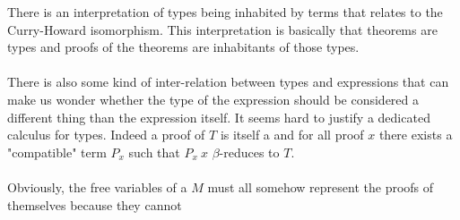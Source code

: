 There is an interpretation of types being inhabited by terms that relates to the Curry-Howard isomorphism. This interpretation is basically that theorems are types and proofs of the theorems are inhabitants of those types. \\
\\
There is also some kind of inter-relation between types and expressions that can make us wonder whether the type of the expression should be considered a different thing than the expression itself. It seems hard to justify a dedicated calculus for types. Indeed a proof of $T$ is itself a \lterm and for all proof $x$ there exists a "compatible" term $P_x$ such that $P_x\ x$ $\beta$-reduces to $T$.\\
\\
Obviously, the free variables of a \lterm $M$ must all somehow represent the proofs of themselves because they cannot 
